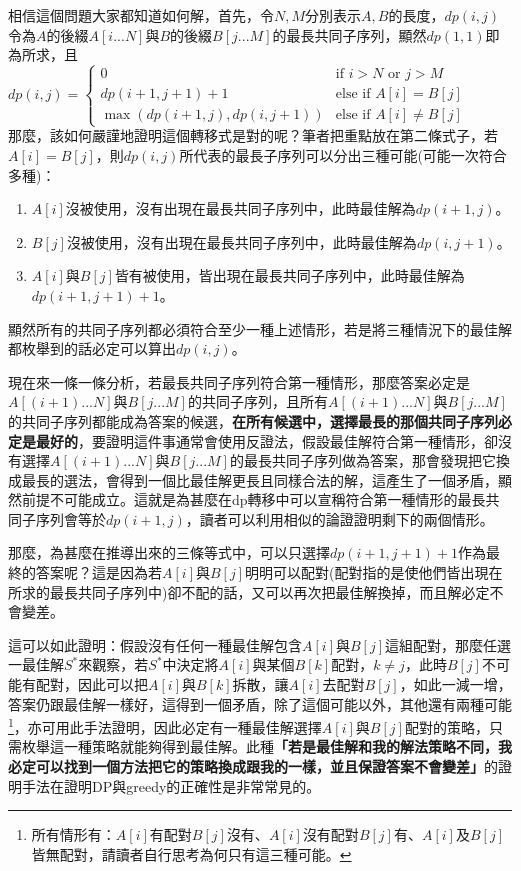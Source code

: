 
相信這個問題大家都知道如何解，首先，令$N, M$分別表示$A, B$的長度，$dp(i, j)$令為$A$的後綴$A[i ... N]$與$B$的後綴$B[j ... M]$的最長共同子序列，顯然$dp(1, 1)$即為所求，且$dp(i, j) =
\begin{cases}
0 & \mbox{if } i>N \mbox{ or } j>M\\
dp(i + 1, j + 1) + 1 & \mbox{else if } A[i]=B[j]\\
\max(dp(i + 1, j), dp(i, j + 1)) & \mbox{else if } A[i] \neq B[j]
\end{cases}$
\\
那麼，該如何嚴謹地證明這個轉移式是對的呢？筆者把重點放在第二條式子，若$A[i]=B[j]$，則$dp(i, j)$所代表的最長子序列可以分出三種可能(可能一次符合多種)：
\begin{enumerate}
\item $A[i]$沒被使用，沒有出現在最長共同子序列中，此時最佳解為$dp(i + 1, j)$。
\item $B[j]$沒被使用，沒有出現在最長共同子序列中，此時最佳解為$dp(i, j + 1)$。
\item $A[i]$與$B[j]$皆有被使用，皆出現在最長共同子序列中，此時最佳解為$dp(i + 1, j + 1) + 1$。
\end{enumerate}
顯然所有的共同子序列都必須符合至少一種上述情形，若是將三種情況下的最佳解都枚舉到的話必定可以算出$dp(i, j)$。

現在來一條一條分析，若最長共同子序列符合第一種情形，那麼答案必定是$A[(i + 1) ... N]$與$B[j ... M]$的共同子序列，且所有$A[(i+1) ... N]$與$B[j ... M]$的共同子序列都能成為答案的候選，\textbf{在所有候選中，選擇最長的那個共同子序列必定是最好的}，要證明這件事通常會使用反證法，假設最佳解符合第一種情形，卻沒有選擇$A[(i+1) ... N]$與$B[j ... M]$的最長共同子序列做為答案，那會發現把它換成最長的選法，會得到一個比最佳解更長且同樣合法的解，這產生了一個矛盾，顯然前提不可能成立。這就是為甚麼在dp轉移中可以宣稱符合第一種情形的最長共同子序列會等於$dp(i + 1, j)$，讀者可以利用相似的論證證明剩下的兩個情形。

那麼，為甚麼在推導出來的三條等式中，可以只選擇$dp(i + 1, j + 1) + 1$作為最終的答案呢？這是因為若$A[i]$與$B[j]$明明可以配對(配對指的是使他們皆出現在所求的最長共同子序列中)卻不配的話，又可以再次把最佳解換掉，而且解必定不會變差。

這可以如此證明：假設沒有任何一種最佳解包含$A[i]$與$B[j]$這組配對，那麼任選一最佳解$S^*$來觀察，若$S^*$中決定將$A[i]$與某個$B[k]$配對，$k \neq j$，此時$B[j]$不可能有配對，因此可以把$A[i]$與$B[k]$拆散，讓$A[i]$去配對$B[j]$，如此一減一增，答案仍跟最佳解一樣好，這得到一個矛盾，除了這個可能以外，其他還有兩種可能\footnote{所有情形有：$A[i]$有配對$B[j]$沒有、$A[i]$沒有配對$B[j]$有、$A[i]$及$B[j]$皆無配對，請讀者自行思考為何只有這三種可能。}，亦可用此手法證明，因此必定有一種最佳解選擇$A[i]$與$B[j]$配對的策略，只需枚舉這一種策略就能夠得到最佳解。此種\textbf{「若是最佳解和我的解法策略不同，我必定可以找到一個方法把它的策略換成跟我的一樣，並且保證答案不會變差」}的證明手法在證明DP與greedy的正確性是非常常見的。

